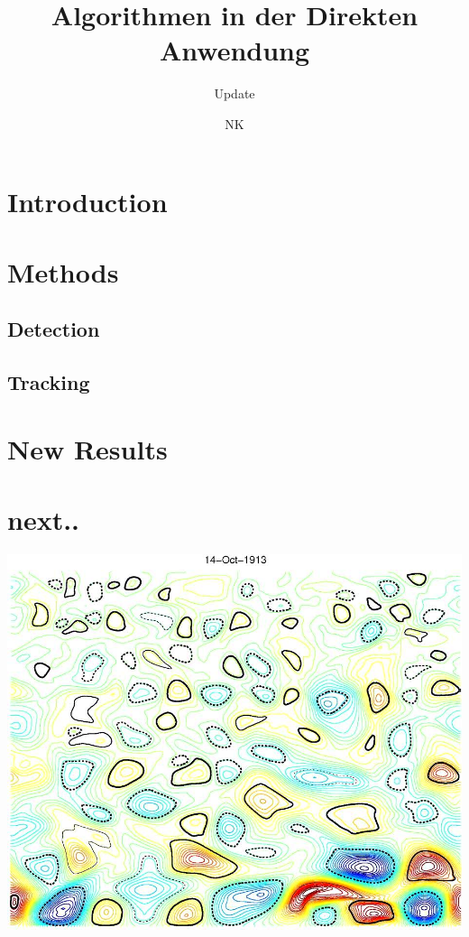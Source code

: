 \documentclass{beamer}
\begin{document}
\title{Algorithmen in der Direkten Anwendung}
\subtitle{Update}
\author{NK}
%
\section*{Introduction}

\section{Methods}
\subsection{Detection}

\subsection{Tracking}

\section{New Results}

\section{next..}


\begin{frame}
\begin{center}
\centering
\href{run:mplayer ./MOViq55RoL4MadShort.avi}{
\includegraphics[scale=0.25]{MOViq55RoL4MadShort.jpeg}}
\end{center}
\end{frame}
\end{document}

